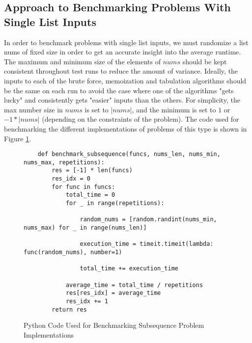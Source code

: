 \subsection{Approach to Benchmarking Problems With Single List Inputs}
In order to benchmark problems with single list inputs, we must randomize a list nums of fixed size in order to get an accurate insight into the average runtime.
The maximum and minimum size of the elements of $nums$ should be kept consistent throughout test runs to reduce the amount of variance.
Ideally, the inputs to each of the brute force, memoization and tabulation algorithms should be the same on each run to avoid the case where one of the algorithms "gets lucky" and consistently gets "easier" inputs than the others.
For simplicity, the max number size in $nums$ is set to $|nums|$, and the minimum is set to $1$ or $-1 * |nums|$ (depending on the constraints of the problem).
The code used for benchmarking the different implementations of problems of this type is shown in Figure \ref{fig:bm-subsequence}.

\begin{figure}[H]
    \centering
    \begin{lstlisting}
    def benchmark_subsequence(funcs, nums_len, nums_min, nums_max, repetitions):
        res = [-1] * len(funcs)
        res_idx = 0
        for func in funcs:
            total_time = 0
            for _ in range(repetitions):
    
                random_nums = [random.randint(nums_min, nums_max) for _ in range(nums_len)]
                
                execution_time = timeit.timeit(lambda: func(random_nums), number=1)
    
                total_time += execution_time
    
            average_time = total_time / repetitions
            res[res_idx] = average_time
            res_idx += 1
        return res
    \end{lstlisting}
    \caption{Python Code Used for Benchmarking Subsequence Problem Implementations}
    \label{fig:bm-subsequence}
\end{figure}


